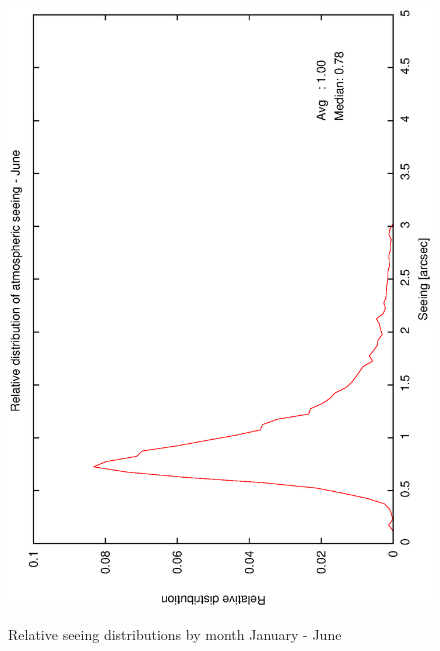 {{\begin{figure}[htbp]
\begin{center}
{   \includegraphics[scale=0.25, angle=-90]{figures/ecs/corr_see_dist_jun.eps}
  }
 \end{center}
  \caption{Relative seeing distributions by month January - June}
\label{fig:see_dist_janjun}
\end{figure}

}}

